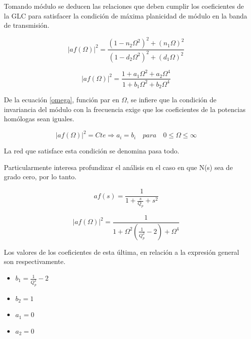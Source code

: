 \bigskip
\hspace{1mm} Tomando módulo se deducen las relaciones que deben cumplir los coeficientes de la GLC para satisfacer la condición de máxima planicidad de módulo en la banda de transmisión.

\begin{equation}
    |af(\Omega)|^2 = \frac{(1 - n_2 \Omega ^2)^2 + (n_1 \Omega)^2}{(1 - d_2 \Omega ^2)^2 + (d_1 \Omega)^2}
\end{equation}

\begin{equation}
    |af(\Omega)|^2 = \frac{1 + a_1 \Omega ^2 + a_2 \Omega^4}{1 + b_1 \Omega ^2 + b_2 \Omega^4} \label{omega}
\end{equation}

\bigskip
\hspace{1mm} De la ecuación \ref{omega}, función par en \( \Omega \), se infiere que la condición de invariancia del módulo con la frecuencia exige que los coeficientes de la potencias homólogas sean iguales.

\begin{equation}
    |af(\Omega)|^2 = Cte \Longrightarrow a_i = b_i \quad para \quad 0 \leq \Omega \leq \infty
\end{equation}

\bigskip
\hspace{1mm} La red que satisface esta condición se denomina pasa todo.

\bigskip
\hspace{1mm} Particularmente interesa profundizar el análisis en el caso en que N(s) sea de grado cero, por lo tanto.

\begin{equation}
    af(s) = \frac{1}{1 + \frac{s}{Q_p} + s^2}
\end{equation}

\begin{equation}
    |af(\Omega )|^2 = \frac{1}{1 + \Omega ^2 \left(\frac{1}{Q_p^2} - 2\right) + \Omega ^4}
\end{equation}

\bigskip
\hspace{1mm} Los valores de los coeficientes de esta última, en relación a la expresión general son respectivamente.

\begin{itemize}[itemsep=1pt]
    \item \( b_1 = \frac{1}{Q_p^2} - 2 \)
    \item \( b_2 = 1 \)
    \item \( a_1 = 0 \)
    \item \( a_2 = 0 \)
\end{itemize}

